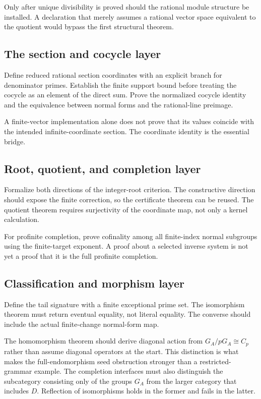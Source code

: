 Only after unique divisibility is proved should the rational module structure be installed. A declaration that merely assumes a rational vector space equivalent to the quotient would bypass the first structural theorem.

\subsection{The section and cocycle layer}
Define reduced rational section coordinates with an explicit branch for denominator primes. Establish the finite support bound before treating the cocycle as an element of the direct sum. Prove the normalized cocycle identity and the equivalence between normal forms and the rational-line preimage.

A finite-vector implementation alone does not prove that its values coincide with the intended infinite-coordinate section. The coordinate identity is the essential bridge.

\subsection{Root, quotient, and completion layer}
Formalize both directions of the integer-root criterion. The constructive direction should expose the finite correction, so the certificate theorem can be reused. The quotient theorem requires surjectivity of the coordinate map, not only a kernel calculation.

For profinite completion, prove cofinality among all finite-index normal subgroups using the finite-target exponent. A proof about a selected inverse system is not yet a proof that it is the full profinite completion.

\subsection{Classification and morphism layer}
Define the tail signature with a finite exceptional prime set. The isomorphism theorem must return eventual equality, not literal equality. The converse should include the actual finite-change normal-form map.

The homomorphism theorem should derive diagonal action from $G_A/pG_A\cong C_p$ rather than assume diagonal operators at the start. This distinction is what makes the full-endomorphism seed obstruction stronger than a restricted-grammar example. The completion interfaces must also distinguish the subcategory consisting only of the groups $G_A$ from the larger category that includes $D$. Reflection of isomorphisms holds in the former and fails in the latter.

